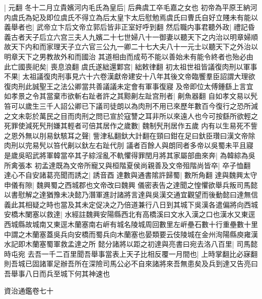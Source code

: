 |{
	元翻}
冬十二月立貴嬪河内毛氏為皇后|{
	后典虞工卒毛嘉之女也}
初帝為平原王納河内虞氏為妃及即位虞氏不得立為后太皇卞太后慰勉焉虞氏曰曹氏自好立賤未有能以義舉者也|{
	武帝立卞后文帝立郭后皆非正室好呼到翻}
然后職内事君聽外政|{
	禮記昏義古者天子后立六宫三夫人九嬪二十七世婦八十一御妻以聽天下之内治以明章婦順故天下内和而家理天子立六官三公九一卿二十七大夫八十一元士以聽天下之外治以明章天下之男教故外和而國治}
其道相由而成苟不能以善始未有能令終者也殆必由此亡國喪祀矣|{
	喪息浪翻}
虞氏遂絀還鄴宫|{
	絀敕律翻}
初太祖世祖皆議復肉刑以軍事不果|{
	太祖議復肉刑事見六十六卷漢獻帝建安十八年其後文帝臨饗羣臣詔謂大理欲復肉刑此誠聖王之法公卿當共善議議未定會有軍事復寢}
及帝即位太傅鍾繇上言宜如孝景之令其當棄市欲斬右趾者許之其黥劓左趾宫刑者|{
	劓魚器翻}
自如孝文易以髠笞可以歲生三千人詔公卿已下議司徒朗以為肉刑不用已來歷年數百今復行之恐所減之文未彰於萬民之目而肉刑之問已宣於寇讐之耳非所以來遠人也今可按繇所欲輕之死罪使減死髠刑嫌其輕者可倍其居作之歲數|{
	魏制髠刑居作五歲}
内有以生易死不訾之恩外無以刖易釱駭耳之聲|{
	訾津私翻釱大計翻在頸曰鉗在足曰釱臣瓚曰漢文帝除肉刑以完易髠以笞代劓以釱左右趾代刖}
議者百餘人與朗同者多帝以吳蜀未平且寢是歲吳昭武將軍韓當卒其子綜淫亂不軌懼得罪閏月將其家屬部曲來奔|{
	為韓綜為吳所禽張本}
初孟達既為文帝所寵又與桓階夏侯尚親善及文帝殂階尚皆卒|{
	卒子恤翻}
達心不自安諸葛亮聞而誘之|{
	誘音酉}
達數與通書隂許歸蜀|{
	數所角翻}
達與魏興太守申儀有隙|{
	魏興蜀之西城郡也文帝改曰魏興}
儀密表告之達聞之惶懼欲舉兵叛司馬懿以書慰解之達猶豫未决懿乃潛軍進討諸將言達與吳漢交通宜觀望而後動懿曰達無信義此其相疑之時也當及其未定促决之乃倍道兼行八日到其城下吳漢各遣偏將向西城安橋木闌塞以救達|{
	水經註魏興安陽縣西北有高橋溪曰文水入漢之口也漢水又東逕西城縣故城南又東逕木蘭塞南右㟁有城名陵城周回數里左㟁壘石數十行重壘數十里中謂之木蘭塞蓋吳兵向安橋而蜀兵向木蘭塞也晏類要云伎陵城在金州洵陽縣庾雍漢水記即木蘭塞蜀軍救孟達之所}
懿分諸將以距之初達與亮書曰宛去洛八百里|{
	司馬懿時屯宛}
去吾一千二百里聞吾舉事當表上天子比相反覆一月間也|{
	上時掌翻比必寐翻}
則吾城已固諸軍足辦吾所在深險司馬公必不自來諸將來吾無患矣及兵到達又告亮曰吾舉事八日而兵至城下何其神速也

資治通鑑卷七十
